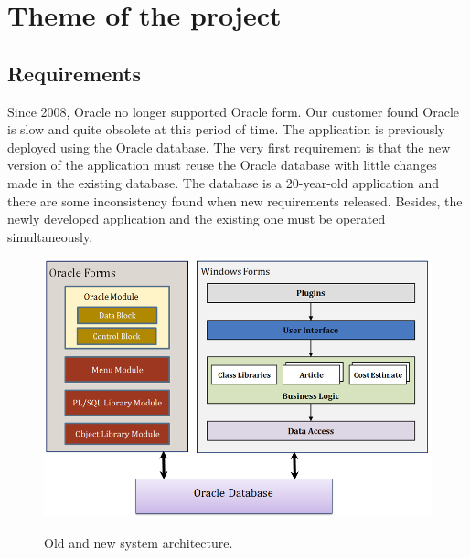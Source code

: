 \chapter{Theme of the project}

\section{Requirements}
Since 2008, Oracle no longer supported Oracle form.  Our customer found Oracle is slow and quite obsolete at this period of time. The application is previously deployed using the Oracle database. The very first requirement is that the new version of the application must reuse the Oracle database with little changes made in the existing database.  The database is a 20-year-old application and there are some inconsistency found when new requirements released. Besides, the newly developed application and the existing one must be operated simultaneously. 
\begin{figure}[ht]\centering
	\includegraphics[width=.9\textwidth]{pic_old_new.png}\label{fig_system}
	\caption{Old and new system architecture.}
\end{figure}
\par
